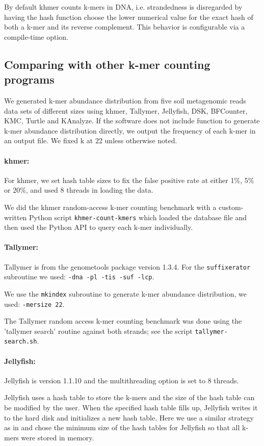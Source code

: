 \documentclass[10pt]{article}
\begin{document}
By default khmer counts k-mers in DNA, i.e. strandedness is
disregarded by having the hash function choose the lower numerical
value for the exact hash of both a k-mer and its reverse complement.
This behavior is configurable via a compile-time option.

\subsection*{Comparing with other k-mer counting programs}

We generated k-mer abundance distribution from five soil metagenomic reads
data sets of different sizes using khmer, Tallymer, Jellyfish, DSK, BFCounter, 
KMC, Turtle and KAnalyze. If the software 
does not include function to generate k-mer abundance distribution directly, we output the
frequency of each k-mer in an output file.
We fixed k at 22 unless otherwise noted.

\paragraph{khmer:}
For khmer, we set hash table sizes to fix the false positive rate at
either 1\%, 5\% or 20\%, and used 8 threads in loading the data.

We did the khmer random-access k-mer counting benchmark with a
custom-written Python script {\tt khmer-count-kmers} which loaded the
database file and then used the Python API to query each k-mer
individually.

\paragraph{Tallymer:}
Tallymer is from the genometools package version 1.3.4. For the {\tt suffixerator} subroutine 
we used:
{\tt -dna -pl -tis -suf -lcp}.

We use the {\tt mkindex} subroutine to generate k-mer abundance distribution, we used:
{\tt -mersize 22}.

The Tallymer random access k-mer counting benchmark was done using the
'tallymer search' routine against both strands; see the script
{\tt tallymer-search.sh}.

\paragraph{Jellyfish:}
Jellyfish is version 1.1.10 and the multithreading option is set to 8 threads.

Jellyfish uses a hash table to store the k-mers and the size of the
hash table can be modified by the user.  When the specified hash table
fills up, Jellyfish writes it to the hard
disk and initializes a new hash table.  Here we use a
similar strategy as in \cite{Melsted2011} and chose the minimum size of the hash 
tables for Jellyfish so that all k-mers were stored in memory.
\end{document}
